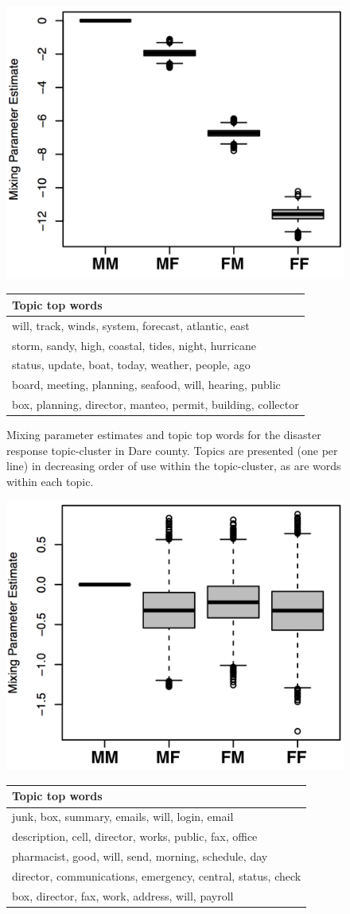 \documentclass{pnastwo}
\begin{document}
\begin{article}
\begin{figure}
	\centering
	\includegraphics[width = .37\textwidth]{./images/Dare_3_MP.png}
	\begin{tabular}{m{}}
	\toprule
	Topic top words\\
	\midrule
	will, track, winds, system, forecast, atlantic, east\\ 
	storm, sandy, high, coastal, tides, night, hurricane\\ 
	status, update, boat, today, weather, people, ago\\ 
	board, meeting, planning, seafood, will, hearing, public\\ 
	box, planning, director, manteo, permit, building, collector\\ 
	\bottomrule

	\end{tabular}
	\caption{\label{tab: dare 3 mp} Mixing parameter estimates and topic top words for the disaster response topic-cluster in Dare county. Topics are presented (one per line) in decreasing order of use within the topic-cluster, as are words within each topic.}
\end{figure}



\begin{figure}
	\centering
	\includegraphics[width = .37\textwidth]{./images/Hoke_3_MP.png}
	\begin{tabular}{m{}}
	\toprule
	Topic top words\\
	\midrule
	junk, box, summary, emails, will, login, email\\ 
	description, cell, director, works, public, fax,  office\\ 
	pharmacist, good, will, send, morning, schedule, day\\ 
	director, communications, emergency, central, status, check\\ 
	box, director, fax, work, address, will, payroll\\ 
	\bottomrule


\end{tabular}
\end{figure}
\end{article}
\end{document}
